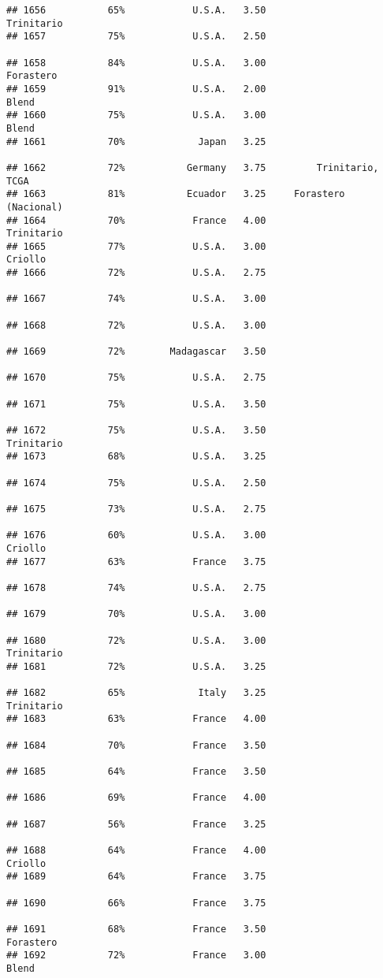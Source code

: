 \documentclass[
]{article}
\begin{document}
\begin{verbatim}
## 1656           65%            U.S.A.   3.50               Trinitario
## 1657           75%            U.S.A.   2.50                         
## 1658           84%            U.S.A.   3.00                Forastero
## 1659           91%            U.S.A.   2.00                    Blend
## 1660           75%            U.S.A.   3.00                    Blend
## 1661           70%             Japan   3.25                         
## 1662           72%           Germany   3.75         Trinitario, TCGA
## 1663           81%           Ecuador   3.25     Forastero (Nacional)
## 1664           70%            France   4.00               Trinitario
## 1665           77%            U.S.A.   3.00                  Criollo
## 1666           72%            U.S.A.   2.75                         
## 1667           74%            U.S.A.   3.00                         
## 1668           72%            U.S.A.   3.00                         
## 1669           72%        Madagascar   3.50                         
## 1670           75%            U.S.A.   2.75                         
## 1671           75%            U.S.A.   3.50                         
## 1672           75%            U.S.A.   3.50               Trinitario
## 1673           68%            U.S.A.   3.25                         
## 1674           75%            U.S.A.   2.50                         
## 1675           73%            U.S.A.   2.75                         
## 1676           60%            U.S.A.   3.00                  Criollo
## 1677           63%            France   3.75                         
## 1678           74%            U.S.A.   2.75                         
## 1679           70%            U.S.A.   3.00                         
## 1680           72%            U.S.A.   3.00               Trinitario
## 1681           72%            U.S.A.   3.25                         
## 1682           65%             Italy   3.25               Trinitario
## 1683           63%            France   4.00                         
## 1684           70%            France   3.50                         
## 1685           64%            France   3.50                         
## 1686           69%            France   4.00                         
## 1687           56%            France   3.25                         
## 1688           64%            France   4.00                  Criollo
## 1689           64%            France   3.75                         
## 1690           66%            France   3.75                         
## 1691           68%            France   3.50                Forastero
## 1692           72%            France   3.00                    Blend

\end{verbatim}
\end{document}
